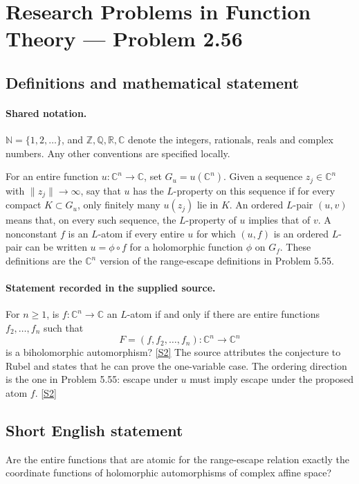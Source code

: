 \documentclass[11pt]{article}
\newcommand{\sref}[2]{\hyperlink{source:#1:#2}{[S#2]}}
\begin{document}
\section{Research Problems in Function Theory — Problem 2.56}\label{statement}

\subsection{Definitions and mathematical statement}

\paragraph{Shared notation.}$\mathbb N=\{1,2,\ldots\}$, and $\mathbb Z,\mathbb Q,\mathbb R,\mathbb C$ denote the integers, rationals, reals and complex numbers. Any other conventions are specified locally.


For an entire function $u:\mathbb C^n\to\mathbb C$, set $G_u=u(\mathbb C^n)$. Given a sequence $z_j\in\mathbb C^n$ with $\|z_j\|\to\infty$, say that $u$ has the $L$-property on this sequence if for every compact $K\subset G_u$, only finitely many $u(z_j)$ lie in $K$.
An ordered $L$-pair $(u,v)$ means that, on every such sequence, the $L$-property of $u$ implies that of $v$.
A nonconstant $f$ is an $L$-atom if every entire $u$ for which $(u,f)$ is an ordered $L$-pair can be written $u=\phi\circ f$ for a holomorphic function $\phi$ on $G_f$.
These definitions are the $\mathbb C^n$ version of the range-escape definitions in Problem 5.55.

\paragraph{Statement recorded in the supplied source.}
For $n\ge1$, is $f:\mathbb C^n\to\mathbb C$ an $L$-atom if and only if there are entire functions $f_2,\ldots,f_n$ such that
\[F=(f,f_2,\ldots,f_n):\mathbb C^n\longrightarrow\mathbb C^n\]
is a biholomorphic automorphism? \sref{statement}{2}
The source attributes the conjecture to Rubel and states that he can prove the one-variable case. The ordering direction is the one in Problem 5.55: escape under $u$ must imply escape under the proposed atom $f$. \sref{statement}{2}
\subsection{Short English statement}
Are the entire functions that are atomic for the range-escape relation exactly the coordinate functions of holomorphic automorphisms of complex affine space?
\end{document}
